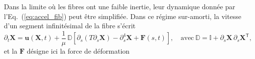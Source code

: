 \documentclass[a4paper,11pt]{article}
\begin{document}
Dans la limite où les fibres ont une faible inertie, leur dynamique donnée par l'Eq.~(\ref{eq:accel_fib}) peut être simplifiée. Dans ce régime sur-amorti, la vitesse d'un segment infinitésimal de la fibre s'écrit
\begin{equation}
	\partial_t \bm X = \bm u(\bm X,t) +\frac{1}{\mu}\,\mathbb{D}\left[ \partial_s(T\partial_s \bm X) - \partial_s^4 \bm X + \bm F(s,t) \right]\!,\quad\mbox{avec}\ \mathbb{D} = \mathbb{I} + \partial_s\bm X\,\partial_s\bm X^{\mathsf{T}},
\end{equation}
et la  $\bm F$ désigne ici la force de déformation 



\end{document}
